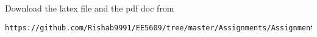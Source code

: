 \documentclass[journal,12pt,twocolumn]{IEEEtran}
\begin{document}
% 
\maketitle
\renewcommand{\theequation}{\arabic{equation}}
%
%
Download the latex file and the pdf doc from
\begin{lstlisting}
https://github.com/Rishab9991/EE5609/tree/master/Assignments/Assignment7
\end{lstlisting}
\end{document}
